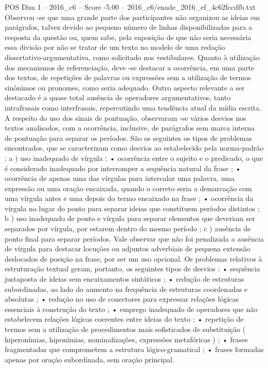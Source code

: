 \begin{textsample}{POS Dim 1 – 2016\_c6 – Score -5.00 – 2016\_c6/enade\_2016\_ef\_4c62fccdfb.txt}
Observou -se que uma grande parte dos participantes não organizou as ideias em parágrafos, talvez devido ao pequeno número de linhas disponibilizadas para a resposta da questão ou, quem sabe, pela suposição de que não seria necessária essa divisão por não se tratar de um texto no modelo de uma redação dissertativo-argumentativa, como solicitado nos vestibulares.
Quanto à utilização dos mecanismos de referenciação, deve -se destacar a ocorrência, em uma parte dos textos, de repetições de palavras ou expressões sem a utilização de termos sinônimos ou pronomes, como seria adequado.
Outro aspecto relevante a ser destacado é a quase total ausência de operadores argumentativos, tanto intrafrasais como interfrasais, repercutindo uma tendência atual da mídia escrita.
A respeito do uso dos sinais de pontuação, observaram -se vários desvios nos textos analisados, com a ocorrência, inclusive, de parágrafos sem marca interna de pontuação para separar os períodos.
São os seguintes os tipos de problemas encontrados, que se caracterizam como desvios ao estabelecido pela norma-padrão : a ) uso inadequado de vírgula : • ocorrência entre o sujeito e o predicado, o que é considerado inadequado por interromper a sequência natural da frase ; • ocorrência de apenas uma das vírgulas para intercalar uma palavra, uma expressão ou uma oração encaixada, quando o correto seria a demarcação com uma vírgula antes e uma depois do termo encaixado na frase ; • ocorrência da vírgula no lugar do ponto para separar ideias que constituem períodos distintos ; b ) uso inadequado de ponto e vírgula para separar elementos que deveriam ser separados por vírgula, por estarem dentro do mesmo período ; c ) ausência de ponto final para separar períodos.
Vale observar que não foi penalizada a ausência de vírgula para destacar locuções ou adjuntos adverbiais de pequena extensão deslocados de posição na frase, por ser um uso opcional.
Os problemas relativos à estruturação textual geram, portanto, os seguintes tipos de desvios : • sequência justaposta de ideias sem encaixamentos sintáticos ; • redução de estruturas subordinadas, ao lado do aumento na frequência de estruturas coordenadas e absolutas ; • redução no uso de conectores para expressar relações lógicas essenciais à construção do texto ; • emprego inadequado de operadores que não estabelecem relações lógicas coerentes entre ideias do texto ; • repetição de termos sem a utilização de procedimentos mais sofisticados de substituição ( hiperonímias, hiponímias, nominalizações, expressões metafóricas ) ; • frases fragmentadas que comprometem a estrutura lógico-gramatical ; • frases formadas apenas por oração subordinada, sem oração principal.

\end{textsample}

